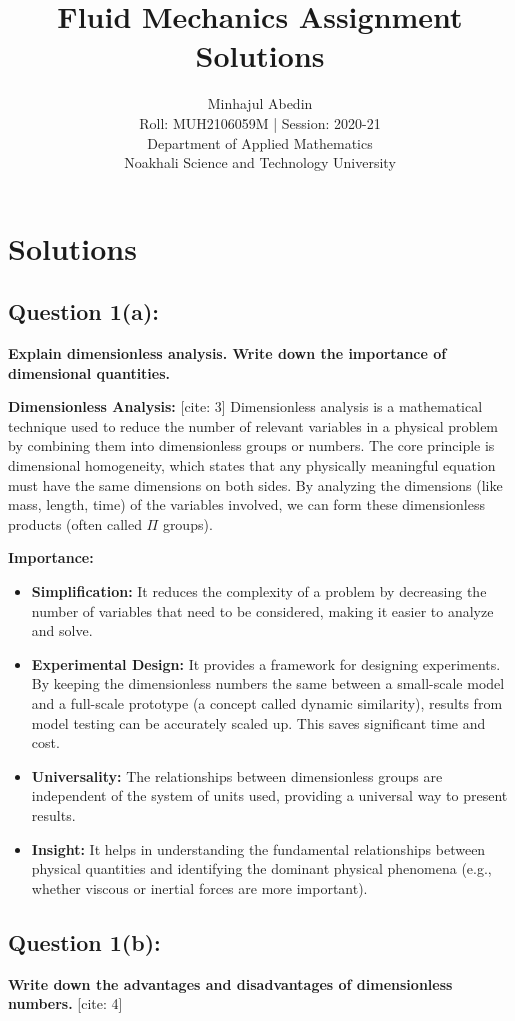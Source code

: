 \documentclass{article}
\title{\textbf{Fluid Mechanics Assignment Solutions}}
\author{Minhajul Abedin \\Roll: MUH2106059M  | Session: 2020-21 \\ Department of Applied Mathematics \\ Noakhali Science and Technology University}
\begin{document}
\maketitle

\section*{Solutions}
\hrulefill

\subsection*{\textbf{Question 1(a):}}
\textbf{Explain dimensionless analysis. Write down the importance of dimensional quantities.}

\textbf{Dimensionless Analysis:} [cite: 3]
Dimensionless analysis is a mathematical technique used to reduce the number of relevant variables in a physical problem by combining them into dimensionless groups or numbers. The core principle is dimensional homogeneity, which states that any physically meaningful equation must have the same dimensions on both sides. By analyzing the dimensions (like mass, length, time) of the variables involved, we can form these dimensionless products (often called $\Pi$ groups).

\textbf{Importance:}
\begin{itemize}
    \item \textbf{Simplification:} It reduces the complexity of a problem by decreasing the number of variables that need to be considered, making it easier to analyze and solve.
    \item \textbf{Experimental Design:} It provides a framework for designing experiments. By keeping the dimensionless numbers the same between a small-scale model and a full-scale prototype (a concept called dynamic similarity), results from model testing can be accurately scaled up. This saves significant time and cost.
    \item \textbf{Universality:} The relationships between dimensionless groups are independent of the system of units used, providing a universal way to present results.
    \item \textbf{Insight:} It helps in understanding the fundamental relationships between physical quantities and identifying the dominant physical phenomena (e.g., whether viscous or inertial forces are more important).
\end{itemize}
\hrulefill

\subsection*{\textbf{Question 1(b):}}
\textbf{Write down the advantages and disadvantages of dimensionless numbers.} [cite: 4]
\end{document}
